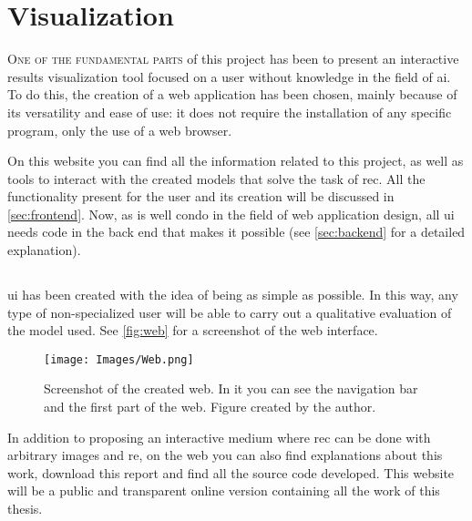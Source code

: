 

\chapter{Visualization}\label{cha:web}



\lettrine{O}{ne of the fundamental parts} of this project has been to present
an interactive results visualization tool focused on a user without knowledge
in the field of \gls{ai}. To do this, the creation of a web application has
been chosen, mainly because of its versatility and ease of use: it does not
require the installation of any specific program, only the use of a web
browser.

On this website you can find all the information related to this project, as
well as tools to interact with the created models that solve the task of
\gls{rec}. All the functionality present for the user and its creation will be
discussed in \vref{sec:frontend}. Now, as is well condo in the field of web
application design, all \gls{ui} needs code in the back end that makes it
possible (see \vref{sec:backend} for a detailed explanation).



\section{}%
\label{sec:frontend}

\gls{ui} has been created with the idea of being as simple as possible. In this
way, any type of non-specialized user will be able to carry out a qualitative
evaluation of the model used. See \vref{fig:web} for a screenshot of the web
interface.

\begin{figure}[ht]
  \centering
  \texttt{[image: Images/Web.png]}
  \caption[Screenshot of the created web]{Screenshot of the created web. In it
    you can see the navigation bar and the first part of the web. Figure
    created by the author.}%
  \label{fig:web}
\end{figure}

In addition to proposing an interactive medium where \gls{rec} can be done with
arbitrary images and \gls{re}, on the web you can also find explanations about
this work, download this report and find all the source code developed. This
website will be a public and transparent online version containing all the work
of this thesis.

